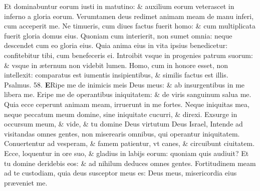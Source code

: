\documentclass[a5paper,10pt]{book}
\def\ae{æ}
\begin{document}
\begin{multicols*}{2}
\newline \color{red} E\color{black}t dominabuntur eorum iusti in matutino: \& auxilium eorum veterascet in inferno a gloria eorum.
\newline \color{red} V\color{black}erumtamen deus redimet animam meam de manu inferi, cum acceperit me.
\newline \color{red} N\color{black}e timueris, cum diues factus fuerit homo: \& cum multiplicata fuerit gloria domus eius.
\newline \color{red} Q\color{black}uoniam cum interierit, non sumet omnia: neque descendet cum eo gloria eius.
\newline \color{red} Q\color{black}uia anima eius in vita ipsius benedicetur: confitebitur tibi, cum benefeceris ei.
\newline \color{red} I\color{black}ntroibit vsque in progenies patrum suorum: \& vsque in \ae ternum non videbit lumen.
\newline \color{red} H\color{black}omo, cum in honore esset, non intellexit: comparatus est iumentis insipientibus, \& similis factus est illis.
\newline \color{red} Psalmus. 58. \color{black}
\vspace{-1em}
\lettrine[lines=2]{\bfseries \color{red} E}{}Ripe me de inimicis meis Deus meus: \& ab insurgentibus in me libera me.
\newline \color{red} E\color{black}ripe me de operantibus iniquitatem: \& de viris sanguinum salua me.
\newline \color{red} Q\color{black}uia ecce ceperunt animam meam, irruerunt in me fortes.
\newline \color{red} N\color{black}eque iniquitas mea, neque peccatum meum domine, sine iniquitate cucurri, \& direxi.
\newline \color{red} E\color{black}xsurge in occursum meum, \& vide, \& tu domine Deus virtutum Deus Israel,
\newline \color{red} I\color{black}ntende ad visitandas omnes gentes, non miserearis omnibus, qui operantur iniquitatem.
\newline \color{red} C\color{black}onuertentur ad vesperam, \& famem patientur, vt canes, \& circuibunt ciuitatem.
\newline \color{red} E\color{black}cce, loquentur in ore suo, \& gladius in labijs eorum: quoniam quis audiuit?
\newline \color{red} E\color{black}t tu domine deridebis eos: \& ad nihilum deduces omnes gentes.%
\newline \color{red} F\color{black}ortitudinem meam ad te custodiam, quia deus susceptor meus es: Deus meus, misericordia eius pr\ae veniet me.

\end{multicols*}
\end{document}
